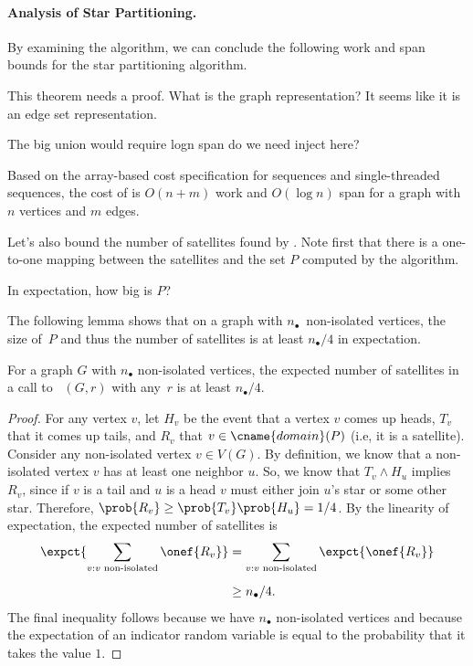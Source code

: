 {\newcommand{\nn}{\ensuremath{n_\bullet}}

\paragraph{Analysis of Star Partitioning.}  

By examining the algorithm, we can conclude the following work and
span bounds for the star partitioning algorithm.

\begin{todo}
This theorem needs a proof.  What is the graph representation? 
It seems like it is an edge set representation.

The big union would require logn span do we need inject here?

\end{todo}

\begin{theorem}
Based on the array-based cost specification for sequences and
single-threaded sequences, the cost of  is $O(n +
m)$ work and $O(\log n)$ span for a graph with $n$ vertices and $m$
edges.
\end{theorem}


Let's also bound the number of satellites found by
.
%
Note first that there is a one-to-one mapping between the satellites
and the set $P$ computed by  the algorithm.
%
\begin{question}
 In expectation, how big is $P$?  
\end{question}
%
The following lemma shows that on a graph with $\nn$~non-isolated
vertices, the size of~$P$ and thus the number of satellites is at least
$\nn/4$ in expectation.

\begin{lemma}
  For a graph $G$ with $\nn$ non-isolated vertices, the expected
  number of satellites in a call to ~$(G,r)$ with
  any~$r$ is at least $\nn/4$.
\end{lemma}

\begin{proof}
  For any vertex $v$, let $H_v$ be the event that a vertex $v$ comes
  up heads, $T_v$ that it comes up tails, and $R_v$ that $v \in
  \cname{domain}(P)$ (i.e, it is a satellite).
%
  Consider any non-isolated vertex $v \in V(G)$.  By definition, we
  know that a non-isolated vertex $v$ has at least one neighbor $u$.
  So, we know that $T_v \land H_u$ implies $R_v$, since if $v$ is a
  tail and $u$ is a head $v$ must either join $u$'s star or some other
  star.  Therefore, $\prob{R_v} \geq \prob{T_v} \prob{H_u} = 1/4$.  By
  the linearity of expectation,  the expected number of satellites is
  \begin{align*}
    \expct{\sum_{v: v \text{ non-isolated}} \onef{R_v}} & = \sum_{v: v
      \text{ non-isolated}} \expct{\onef{R_v}} 
\\[2mm]
  & \geq \nn/4.
  \end{align*}
  The final inequality follows because we have $\nn$ non-isolated
  vertices and because the expectation of an indicator random variable
  is equal to the probability that it takes the value $1$.
\end{proof}

}
